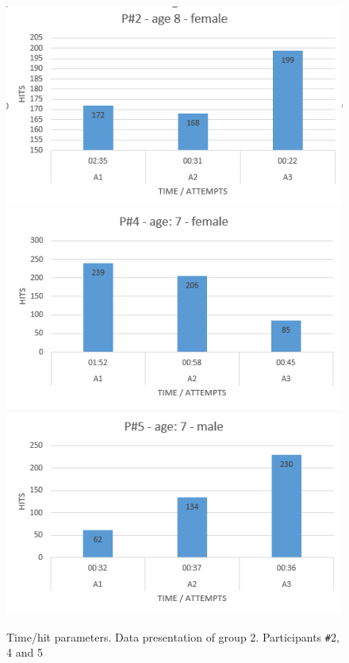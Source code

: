 \begin{figure}[!ht]
    \centering
    \includegraphics[width=.6\textwidth]{figures/p2.png}
    \includegraphics[width=.6\textwidth]{figures/p4.png}
        \includegraphics[width=.6\textwidth]{figures/p5.png}
    \caption{Time/hit parameters. Data presentation of group 2. Participants \texttt{\#}2, 4 and 5}
    \label{fig:agegroup2}
\end{figure}

